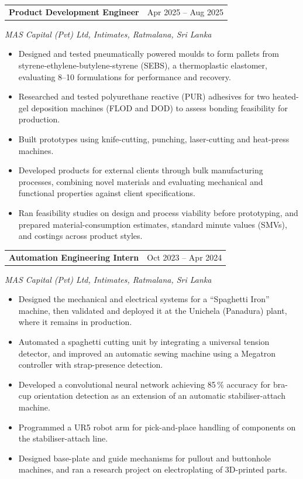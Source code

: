 \documentclass[11pt,letterpaper]{article}
\makeatletter
\newcommand{\cventry}[2]{%
  \vspace{3pt}%
  \noindent\begin{tabularx}{\textwidth}{@{}X r@{}}
    #1 & #2
  \end{tabularx}\par\vspace{-0.5pt}%
}
\newcommand{\cvsub}[1]{{\itshape #1}\par\vspace{1pt}}
\newenvironment{cvlist}
  {\begin{itemize}[leftmargin=1.1em,itemsep=1pt,parsep=0pt,topsep=1.5pt,
                   label=\textendash]}
  {\end{itemize}}
\makeatother
\begin{document}
\cventry{\textbf{Product Development Engineer}}{Apr 2025 -- Aug 2025}
\cvsub{MAS Capital (Pvt) Ltd, Intimates, Ratmalana, Sri Lanka}
\begin{cvlist}
  \item Designed and tested pneumatically powered moulds to form pallets from
        styrene-ethylene-butylene-styrene (SEBS), a thermoplastic elastomer,
        evaluating 8--10 formulations for performance and recovery.
  \item Researched and tested polyurethane reactive (PUR) adhesives for two
        heated-gel deposition machines (FLOD and DOD) to assess bonding
        feasibility for production.
  \item Built prototypes using knife-cutting, punching, laser-cutting and
        heat-press machines.
  \item Developed products for external clients through bulk manufacturing
        processes, combining novel materials and evaluating mechanical and
        functional properties against client specifications.
  \item Ran feasibility studies on design and process viability before
        prototyping, and prepared material-consumption estimates, standard
        minute values (SMVs), and costings across product styles.
\end{cvlist}

\cventry{\textbf{Automation Engineering Intern}}{Oct 2023 -- Apr 2024}
\cvsub{MAS Capital (Pvt) Ltd, Intimates, Ratmalana, Sri Lanka}
\begin{cvlist}
  \item Designed the mechanical and electrical systems for a ``Spaghetti Iron''
        machine, then validated and deployed it at the Unichela (Panadura)
        plant, where it remains in production.
  \item Automated a spaghetti cutting unit by integrating a universal tension
        detector, and improved an automatic sewing machine using a Megatron
        controller with strap-presence detection.
  \item Developed a convolutional neural network achieving 85\,\% accuracy for
        bra-cup orientation detection as an extension of an automatic
        stabiliser-attach machine.
  \item Programmed a UR5 robot arm for pick-and-place handling of components on
        the stabiliser-attach line.
  \item Designed base-plate and guide mechanisms for pullout and buttonhole
        machines, and ran a research project on electroplating of 3D-printed
        parts.
\end{cvlist}
\end{document}
